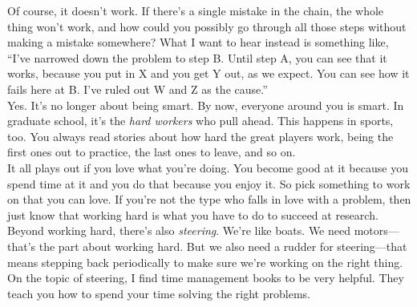   Of course, it doesn't work.  If there's a single mistake in the    chain, the whole thing won't work, and how could you possibly go  through all those steps without making a mistake somewhere?  What I want to   hear instead is something like, ``I've narrowed down the problem to   step B.  Until step A, you can see that it works, because you put in
  X  and you get Y out, as we expect.   You can see how it fails here
  at   B.  I've ruled out W and Z as the cause.'' \\
  
  Yes.  It's no longer about being  smart.  By now, everyone around you is smart.  In graduate school,   it's the {\em  hard workers} who  pull ahead.  This happens  in sports, too.  You always read stories about how hard the great players work, being the first ones out to practice, the last ones to
  leave, and so on.  \\
  
  
  
  It all plays out if you love what you're doing.
  You become good at it because you spend time at it and you do that because you enjoy it.
  So pick something to work on that you can love.   If
  you're not the type who falls in love with a problem, then just know   that working hard is what you have to do to succeed at research. \\
  
  Beyond
  working hard, there's also {\em steering}.  We're like boats.  We need
  motors---that's the part about working hard.  But we also need a rudder for
  steering---that means stepping back periodically to make sure
  we're working on the right thing.  On the topic of steering,
  I find time management books to be very helpful.  They teach you how  to spend your time solving the right problems. \\
  

